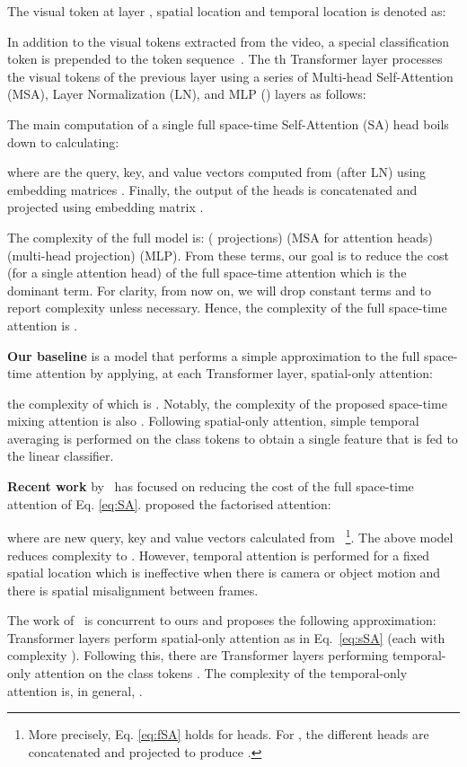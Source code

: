 \documentclass{article}
\begin{document}
The visual token at layer , spatial location  and temporal location  is denoted as: 

In addition to the  visual tokens extracted from the video, a special classification token  is prepended to the token sequence~\citep{devlin2018bert}.
The th Transformer layer processes the visual tokens  of the previous layer using a series of  Multi-head Self-Attention (MSA), Layer Normalization (LN), and MLP () layers as follows:


The main computation of a single full space-time Self-Attention (SA) head boils down to calculating:

where  are the query, key, and value
vectors computed from  (after LN) using embedding matrices . Finally, the output of the  heads is concatenated and projected using embedding matrix .

The complexity of the full model is:  ( projections)  (MSA for  attention heads)  (multi-head projection)  (MLP). From these terms, our goal is to reduce the cost  (for a single attention head) of the full space-time attention which is the dominant term. For clarity, from now on, we will drop constant terms and  to report complexity unless necessary. Hence, the complexity of the full space-time attention is . 

\textbf{Our baseline} is a model that performs a simple approximation to the full space-time attention by applying, at each Transformer layer, spatial-only attention:

the complexity of which is . Notably, the complexity of the proposed space-time mixing attention is also . Following spatial-only attention, simple temporal averaging is performed on the class tokens  to obtain a single feature that is fed to the linear classifier.  

\textbf{Recent work} by~\citep{bertasius2021space, arnab2021vivit} has focused on reducing the cost  of the full space-time attention of Eq. \ref{eq:SA}. \citet{bertasius2021space} proposed the factorised attention:

where  are new query, key and value vectors calculated from ~\footnote{More precisely, Eq. \ref{eq:fSA} holds for  heads. For , the different heads  are concatenated and projected to produce .}. The above model reduces complexity to . However, temporal attention is performed for a fixed spatial location which is  ineffective when there is camera or object motion and there is spatial misalignment between frames. 

The work of~\citep{arnab2021vivit} is concurrent to ours and proposes the following approximation:  Transformer layers perform spatial-only attention as in Eq.~\ref{eq:sSA} (each with complexity ). Following this, there are  Transformer layers performing temporal-only attention on the class tokens . The complexity of the temporal-only attention is, in general, .
\end{document}
